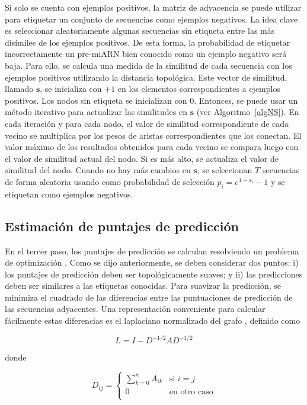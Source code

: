 Si solo se cuenta con ejemplos positivos, la matriz de adyacencia se puede utilizar para etiquetar un conjunto de secuencias como ejemplos negativos. La idea
clave es seleccionar aleatoriamente algunas secuencias sin etiqueta entre las más disímiles de los ejemplos positivos. De esta forma, la probabilidad de
etiquetar incorrectamente un pre-miARN bien conocido como un ejemplo negativo será baja. Para ello, se calcula una medida de la similitud de cada secuencia
con los ejemplos positivos utilizando la distancia topológica. Este vector de similitud, llamado $\mathbf{s}$, se inicializa con $+1$ en los elementos
correspondientes a ejemplos positivos. Los nodos sin etiqueta se inicializan con $0$. Entonces, se puede usar un método iterativo para actualizar las
similitudes en $\mathbf{s}$ (ver Algoritmo~\ref{algNS}). En cada iteración y para cada nodo, el valor de similitud correspondiente de cada vecino se
multiplica por los pesos de aristas correspondientes que los conectan. El valor máximo de los resultados obtenidos para cada vecino se compara luego con el
valor de similitud actual del nodo. Si es más alto, se actualiza el valor de similitud del nodo. Cuando no hay más cambios en $\mathbf{s}$, se seleccionan
$T$ secuencias de forma aleatoria usando como probabilidad de selección $p_{i} = e^{1 - s_{i}} -1$ y se etiquetan como ejemplos negativos.

\subsection{Estimación de puntajes de predicción}

En el tercer paso, los puntajes de predicción se calculan resolviendo un problema de optimización \citep{joachims2003transductive}. Como se dijo
anteriormente, se deben considerar dos puntos: i) los puntajes de predicción deben ser topológicamente suaves; y ii) las predicciones deben ser similares a
las etiquetas conocidas. Para suavizar la predicción, se minimiza el cuadrado de las diferencias entre las puntuaciones de predicción de las secuencias
adyacentes. Una representación conveniente para calcular fácilmente estas diferencias es el laplaciano normalizado del grafo \citep{shi2000normalized}, definido
como

\begin{equation*}
	L=I-D^{-1/2}AD^{-1/2}
\end{equation*}

\noindent donde

\begin{equation*}
	D_{ij} =
	\begin{cases}
		\sum_{k=0}^n A_{ik} & \text{si } i=j \\
		0 & \text{en otro caso} \\
	\end{cases}
\end{equation*}

